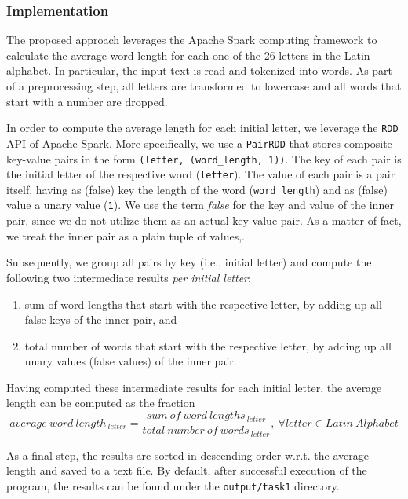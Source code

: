 \documentclass[acmlarge]{acmart}
\begin{document}
  \subsubsection{Implementation}
  The proposed approach leverages the Apache Spark computing framework to calculate the average word length for each one of the 26 letters in the Latin alphabet. In particular, the input text is read and tokenized into words. As part of a preprocessing step, all letters are transformed to lowercase and all words that start with a number are dropped.

  In order to compute the average length for each initial letter, we leverage the \texttt{RDD} API of Apache Spark. More specifically, we use a \texttt{PairRDD} that stores composite key-value pairs in the form \texttt{(letter, (word\_length, 1))}. The key of each pair is the initial letter of the respective word (\texttt{letter}). The value of each pair is a pair itself, having as (false) key the length of the word (\texttt{word\_length}) and as (false) value a unary value (\texttt{1}). We use the term \emph{false} for the key and value of the inner pair, since we do not utilize them as an actual key-value pair. As a matter of fact, we treat the inner pair as a plain tuple of values,.

  Subsequently, we group all pairs by key (i.e., initial letter) and compute the following two intermediate results \emph{per initial letter}:
  \begin{enumerate}
    \item sum of word lengths that start with the respective letter, by adding up all false keys of the inner pair, and
    \item total number of words that start with the respective letter, by adding up all unary values (false values) of the inner pair.
  \end{enumerate}

  Having computed these intermediate results for each initial letter, the average length can be computed as the fraction
  \begin{displaymath}
    average~word~length_{~letter} = \frac{sum~of~word~lengths_{~letter}}{total~number~of~words_{~letter}},~ \forall letter \in Latin~Alphabet
  \end{displaymath}

  As a final step, the results are sorted in descending order w.r.t. the average length and saved to a text file. By default, after successful execution of the program, the results can be found under the \texttt{output/task1} directory.
\end{document}
